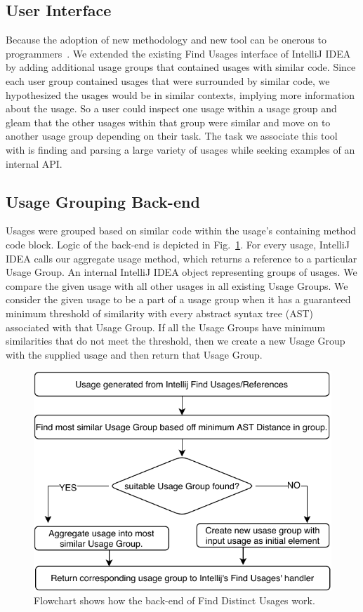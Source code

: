 \documentclass[conference]{IEEEtran}
\begin{document}
\subsection{User Interface} 

Because the adoption of new methodology and new tool can be onerous to programmers~\cite{adaption2002}. We extended the existing Find Usages interface of IntelliJ IDEA by adding additional usage groups that contained usages with similar code. Since each user group contained usages that were surrounded by similar code, we hypothesized the usages would be in similar contexts, implying more information about the usage. So a user could inspect one usage within a usage group and gleam that the other usages within that group were similar and move on to another usage group depending on their task. The task we associate this tool with is finding and parsing a large variety of usages while seeking examples of an internal API.

\subsection{Usage Grouping Back-end} 
Usages were grouped based on similar code within the usage's containing method code block. Logic of the back-end is depicted in Fig.~\ref{fig:flowchart}. For every usage, IntelliJ IDEA calls our aggregate usage method, which returns a reference to a particular Usage Group. An internal IntelliJ IDEA object representing groups of usages. We compare the given usage with all other usages in all existing Usage Groups. We consider the given usage to be a part of a usage group when it has a guaranteed minimum threshold of similarity with every abstract syntax tree (AST)  associated with that Usage Group. If all the Usage Groups have minimum similarities that do not meet the threshold, then we create a new Usage Group with the supplied usage and then return that Usage Group. \par
\begin{figure}
    \centering
    \includegraphics [width=\columnwidth,keepaspectratio, clip]{figures/flowchart}
    \caption{Flowchart shows how the back-end of Find Distinct Usages work. }
\label{fig:flowchart}
\end{figure}
\end{document}
